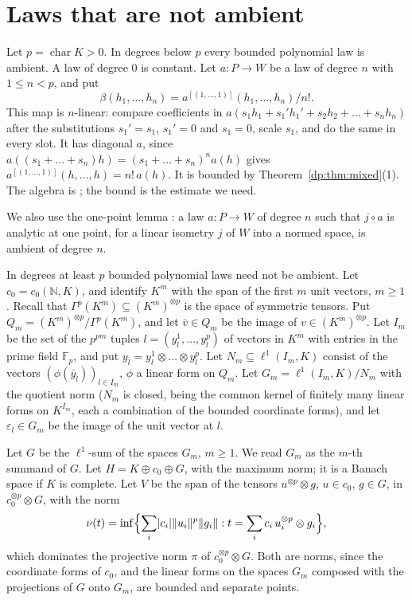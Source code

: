 \documentclass[11pt]{amsart}
\theoremstyle{definition}
\theoremstyle{remark}
\numberwithin{equation}{section}
\newcommand{\N}{\mathbb N}
\newcommand{\F}{\mathbb F}
\newcommand{\abs}[1]{\lvert #1\rvert}
\newcommand{\norm}[1]{\lVert #1\rVert}
\theoremstyle{plain}
\theoremstyle{definition}
\theoremstyle{plain}
\begin{document}
\section{Laws that are not ambient}\label{dp:sec:nonambient}\label{sec:dp}

Let $p=\operatorname{char}K>0$. In degrees below $p$ every bounded polynomial law is ambient. A law of degree $0$ is constant. Let $a\colon P\to W$ be a law of degree $n$ with $1\le n<p$, and put
\[
 \beta(h_1,\dots,h_n)=a^{[(1,\dots,1)]}(h_1,\dots,h_n)/n!.
\]
This map is $n$\nobreakdash-linear: compare coefficients in $a(s_1h_1+s_1'h_1'+s_2h_2+\dots+s_nh_n)$ after the substitutions $s_1'=s_1$, $s_1'=0$ and $s_1=0$, scale $s_1$, and do the same in every slot. It has diagonal $a$, since $a((s_1+\dots+s_n)h)=(s_1+\dots+s_n)^na(h)$ gives $a^{[(1,\dots,1)]}(h,\dots,h)=n!\,a(h)$. It is bounded by Theorem~\ref{dp:thm:mixed}(1). The algebra is \cite[Th.~II.1]{Ro}; the bound is the estimate we need.

We also use the one-point lemma \cite[Proposition~14.9(2)]{I}: a law $a\colon P\to W$ of degree $n$ such that $j\circ a$ is analytic at one point, for a linear isometry $j$ of $W$ into a normed space, is ambient of degree $n$.

In degrees at least $p$ bounded polynomial laws need not be ambient. Let $c_0=c_0(\N,K)$, and identify $K^m$ with the span of the first $m$ unit vectors, $m\ge1$. Recall that $\Gamma^p(K^m)\subseteq(K^m)^{\otimes p}$ is the space of symmetric tensors. Put $Q_m=(K^m)^{\otimes p}/\Gamma^p(K^m)$, and let $\bar v\in Q_m$ be the image of $v\in(K^m)^{\otimes p}$. Let $I_m$ be the set of the $p^{pm}$ tuples $l=(y_l^1,\dots,y_l^p)$ of vectors in $K^m$ with entries in the prime field $\F_p$, and put $y_l=y_l^1\otimes\dots\otimes y_l^p$. Let $N_m\subseteq\ell^1(I_m,K)$ consist of the vectors $(\phi(\bar y_l))_{l\in I_m}$, $\phi$ a linear form on $Q_m$. Let $G_m=\ell^1(I_m,K)/N_m$ with the quotient norm ($N_m$ is closed, being the common kernel of finitely many linear forms on $K^{I_m}$, each a combination of the bounded coordinate forms), and let $\varepsilon_l\in G_m$ be the image of the unit vector at $l$.

Let $G$ be the $\ell^1$-sum of the spaces $G_m$, $m\ge1$. We read $G_m$ as the $m$-th summand of $G$. Let $H=K\oplus c_0\oplus G$, with the maximum norm; it is a Banach space if $K$ is complete. Let $V$ be the span of the tensors $u^{\otimes p}\otimes g$, $u\in c_0$, $g\in G$, in $c_0^{\otimes p}\otimes G$, with the norm
\[
 \nu(t)=\inf\Bigl\{\sum_i\abs{c_i}\norm{u_i}^p\norm{g_i}:t=\sum_ic_i\,u_i^{\otimes p}\otimes g_i\Bigr\},
\]
which dominates the projective norm $\pi$ of $c_0^{\otimes p}\otimes G$. Both are norms, since the coordinate forms of $c_0$, and the linear forms on the spaces $G_m$ composed with the projections of $G$ onto $G_m$, are bounded and separate points.
\end{document}
